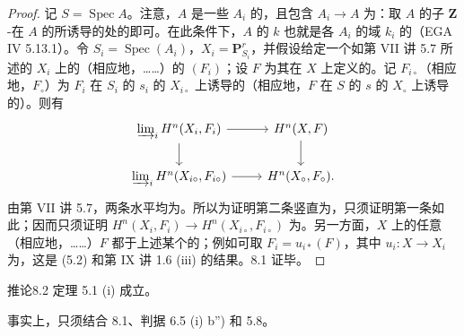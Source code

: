 \begin{proof}
记 $S=\operatorname{Spec}A$。注意，$A$ 是一些 $A_i$ 的，且包含 $A_i\to A$ 为：取 $A$ 的子 $\mathbf Z$-在 $A$ 的所诱导的处的即可。在此条件下，$A$ 的 $k$ 也就是各 $A_i$ 的域 $k_i$ 的（EGA IV 5.13.1）。令 $S_i=\operatorname{Spec}(A_i)$，$X_i=\mathbf P^r_{S_i}$，并假设给定一个如第 VII 讲 5.7 所述的 $X_i$ 上的（相应地，……）的 $(F_i)$；设 $F$ 为其在 $X$ 上定义的。记 $F_{i\circ}$（相应地，$F_\circ$）为 $F_i$ 在 $S_i$ 的 $s_i$ 的 $X_{i\circ}$ 上诱导的（相应地，$F$ 在 $S$ 的 $s$ 的 $X_\circ$ 上诱导的）。则有
\[
\begin{tikzcd}
\varinjlim_i H^n(X_i,F_i)\arrow[r]\arrow[d]&H^n(X,F)\arrow[d]\\
\varinjlim_i H^n(X_{i\circ},F_{i\circ})\arrow[r]&H^n(X_\circ,F_\circ).
\end{tikzcd}
\]
由第 VII 讲 5.7，两条水平均为。所以为证明第二条竖直为，只须证明第一条如此；因而只须证明 $H^n(X_i,F_i)\to H^n(X_{i\circ},F_{i\circ})$ 为。另一方面，$X$ 上的任意（相应地，……）$F$ 都于上述某个的；例如可取 $F_i=u_{i*}(F)$，其中 $u_i:X\to X_i$ 为，这是 (5.2) 和第 IX 讲 1.6 (iii) 的结果。8.1 证毕。
\end{proof}

\begin{SGAresult}{推论}{8.2}
定理 5.1 (i) 成立。
\end{SGAresult}
事实上，只须结合 8.1、判据 6.5 (i) b'') 和 5.8。


